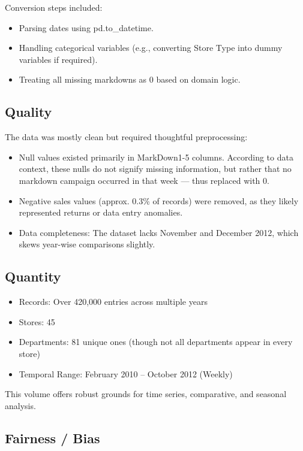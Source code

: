 Conversion steps included:

\begin{itemize}
	\item Parsing dates using pd.to\_datetime.
	\item Handling categorical variables (e.g., converting Store Type into dummy variables if required).
	\item Treating all missing markdowns as 0 based on domain logic.
\end{itemize}


\subsection{Quality}

The data was mostly clean but required thoughtful preprocessing:

\begin{itemize}
	\item Null values existed primarily in MarkDown1-5 columns. According to data context, these nulls do not signify missing information, but rather that no markdown campaign occurred in that week — thus replaced with 0.
	\item Negative sales values (approx. 0.3\% of records) were removed, as they likely represented returns or data entry anomalies.
	\item Data completeness: The dataset lacks November and December 2012, which skews year-wise comparisons slightly.
\end{itemize}

\subsection{Quantity}

\begin{itemize}
	\item Records: Over 420,000 entries across multiple years
	\item Stores: 45
	\item Departments: 81 unique ones (though not all departments appear in every store)
	\item Temporal Range: February 2010 – October 2012 (Weekly)
\end{itemize}

This volume offers robust grounds for time series, comparative, and seasonal analysis.

\subsection{Fairness / Bias}

